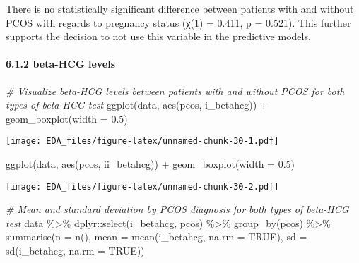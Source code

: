 \documentclass[
]{article}
\newenvironment{Shaded}{\begin{snugshade}}{\end{snugshade}}
\newcommand{\AttributeTok}[1]{\textcolor[rgb]{0.77,0.63,0.00}{#1}}
\newcommand{\CommentTok}[1]{\textcolor[rgb]{0.56,0.35,0.01}{\textit{#1}}}
\newcommand{\ConstantTok}[1]{\textcolor[rgb]{0.00,0.00,0.00}{#1}}
\newcommand{\FloatTok}[1]{\textcolor[rgb]{0.00,0.00,0.81}{#1}}
\newcommand{\FunctionTok}[1]{\textcolor[rgb]{0.00,0.00,0.00}{#1}}
\newcommand{\NormalTok}[1]{#1}
\newcommand{\SpecialCharTok}[1]{\textcolor[rgb]{0.00,0.00,0.00}{#1}}
\begin{document}
There is no statistically significant difference between patients with
and without PCOS with regards to pregnancy status (χ(1) = 0.411, p =
0.521). This further supports the decision to not use this variable in
the predictive models.

\hypertarget{beta-hcg-levels}{%
\paragraph{6.1.2 beta-HCG levels}\label{beta-hcg-levels}}

\begin{Shaded}
\begin{Highlighting}[]
\CommentTok{\# Visualize beta{-}HCG levels between patients with and without PCOS for both types of beta{-}HCG test}
\FunctionTok{ggplot}\NormalTok{(data, }\FunctionTok{aes}\NormalTok{(pcos, i\_betahcg)) }\SpecialCharTok{+} \FunctionTok{geom\_boxplot}\NormalTok{(}\AttributeTok{width =} \FloatTok{0.5}\NormalTok{)}
\end{Highlighting}
\end{Shaded}

\texttt{[image: EDA\_files/figure-latex/unnamed-chunk-30-1.pdf]}

\begin{Shaded}
\begin{Highlighting}[]
\FunctionTok{ggplot}\NormalTok{(data, }\FunctionTok{aes}\NormalTok{(pcos, ii\_betahcg)) }\SpecialCharTok{+} \FunctionTok{geom\_boxplot}\NormalTok{(}\AttributeTok{width =} \FloatTok{0.5}\NormalTok{)}
\end{Highlighting}
\end{Shaded}

\texttt{[image: EDA\_files/figure-latex/unnamed-chunk-30-2.pdf]}

\begin{Shaded}
\begin{Highlighting}[]
\CommentTok{\# Mean and standard deviation by PCOS diagnosis for both types of beta{-}HCG test}
\NormalTok{data }\SpecialCharTok{\%\textgreater{}\%}\NormalTok{ dplyr}\SpecialCharTok{::}\FunctionTok{select}\NormalTok{(i\_betahcg, pcos) }\SpecialCharTok{\%\textgreater{}\%} \FunctionTok{group\_by}\NormalTok{(pcos) }\SpecialCharTok{\%\textgreater{}\%} 
  \FunctionTok{summarise}\NormalTok{(}\AttributeTok{n =} \FunctionTok{n}\NormalTok{(), }
            \AttributeTok{mean =} \FunctionTok{mean}\NormalTok{(i\_betahcg, }\AttributeTok{na.rm =} \ConstantTok{TRUE}\NormalTok{), }
            \AttributeTok{sd =} \FunctionTok{sd}\NormalTok{(i\_betahcg, }\AttributeTok{na.rm =} \ConstantTok{TRUE}\NormalTok{))}
\end{Highlighting}
\end{Shaded}
\end{document}
